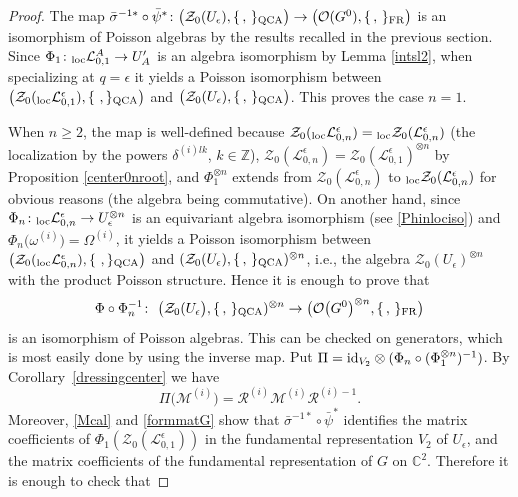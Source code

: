 \documentclass[pdftex]{sigma}%
\numberwithin{equation}{section}
\numberwithin{figure}{section}
\newcommand{\e}{\epsilon}
\newcommand{\mc}{\mathbb{C}}
\newcommand{\Ll}{{\mathcal L}}
\newcommand{\ra}{\rightarrow}
\begin{document}
\begin{proof}
The map $\bar \sigma^{-1*}\circ \bar{\psi}^*{}\colon \big(\mathcal{Z}_0(U_\epsilon),\{\, ,\, \}_{\rm QCA}\big) \ra \big(\mathcal{O}(G^0),\{\, ,\, \}_{\rm FR}\big)$ is an isomorphism of Poisson algebras by the results recalled in the previous section. Since $\Phi_1 \colon {}_{\rm loc}\Ll_{0,1}^A\ra U_A'$ is an algebra isomorphism by Lemma \ref{intsl2}, when specializing at $q=\e$ it yields a Poisson isomorphism between $\big(\mathcal{Z}_0({}_{\rm loc}\Ll_{0,1}^\epsilon),\{\ ,\}_{\rm QCA}\big)$ and $\big(\mathcal{Z}_0(U_\epsilon),\{\, ,\, \}_{\rm QCA}\big)$. This proves the case $n=1$.

When $n\geq 2$, the map is well-defined because $\mathcal{Z}_0({}_{\rm loc}\Ll_{0,n}^\epsilon) = {}_{\rm loc}\mathcal{Z}_0(\Ll_{0,n}^\epsilon)$ (the localization by the powers $\delta^{(i) lk}$, $k\in \mathbb{Z}$), $\mathcal{Z}_0(\Ll_{0,n}^\epsilon) = \mathcal{Z}_0(\Ll_{0,1}^\epsilon)^{\otimes n}$ by Proposition \ref{center0nroot}, and $\Phi_1^{\otimes n}$ extends from $\mathcal{Z}_0(\Ll_{0,n}^\epsilon)$ to ${}_{\rm loc}\mathcal{Z}_0(\Ll_{0,n}^\epsilon)$ for obvious reasons (the algebra being commutative). On another hand, since $\Phi_n \colon {}_{\rm loc}\Ll_{0,n}^\e\ra U_\e^{\otimes n}$ is an equivariant algebra isomorphism (see \eqref{Phinlociso}) and $\Phi_n\big(\omega^{(i)}\big) = \Omega^{(i)}$, it yields a Poisson isomorphism between $\big(\mathcal{Z}_0({}_{\rm loc}\Ll_{0,n}^\epsilon),\{\ ,\}_{\rm QCA}\big)$ and $(\mathcal{Z}_0(U_\epsilon),\{\, ,\, \}_{\rm QCA})^{\otimes n}$, i.e., the algebra $\mathcal{Z}_0(U_\epsilon)^{\otimes n}$ with the product Poisson structure. Hence it is enough to prove that
\[
\Phi \circ \Phi_n^{-1}\colon\ \big(\mathcal{Z}_0(U_\epsilon\big),\{\, ,\, \}_{\rm QCA})^{\otimes n} \ra \big(\mathcal{O}\big(G^0\big)^{\otimes n},\{\, ,\, \}_{\rm FR}\big)
\]
is an isomorphism of Poisson algebras. This can be checked on generators, which is most easily done by using the inverse map. Put $\Pi = {\rm id}_{V_2} \otimes (\Phi_n\circ (\Phi_1^{\otimes n})^{-1})$. By Corollary~\ref{dressingcenter} we have
\begin{equation}\label{defdresscentre}
\Pi\big(\mathcal{M}^{(i)}\big)=\mathcal{R}^{(i)}\mathcal{M}^{(i)}\mathcal{R}^{(i)-1}.
\end{equation}
Moreover, \eqref{Mcal} and \eqref{formmatG} show that $\bar \sigma^{-1*}\circ \bar{\psi}^*$ identifies the matrix coefficients of $\Phi_1(\mathcal{Z}_0(\Ll_{0,1}^\epsilon))$ in the fundamental representation $V_2$ of $U_\e$, and the matrix coefficients of the fundamental representation of $G$ on $\mc^2$. Therefore it is enough to check that

\end{proof}
\end{document}
